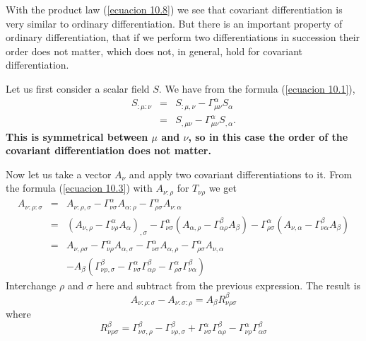 With the product law (\ref{ecuacion 10.8}) we see that covariant 
differentiation is very similar to ordinary differentiation. But there is an 
important property of ordinary differentiation, that if we perform two 
differentiations in succession their order does not matter, which does not, in 
general, hold for covariant differentiation.

Let us first consider a scalar field $S$. We have from the formula 
(\ref{ecuacion 10.1}),
\begin{equation}
 \label{ecuacion 11.1}
 \begin{array}{rcl}
 S_{:\mu:\nu} & = & S_{:\mu,\nu} - \Gamma^{\alpha}_{\mu\nu} S_{\alpha} \\
      & = & S_{,\mu\nu} - \Gamma^{\alpha}_{\mu\nu} S_{,\alpha}.
 \end{array}
\end{equation}
\textbf{This is symmetrical between $\mu$ and $\nu$, so in this 
case the order of the covariant differentiation does not matter.}

Now let us take a vector $A_{\nu}$ and apply two covariant differentiations to 
it. From the formula (\ref{ecuacion 10.3}) with $A_{\nu:\rho}$ for 
$T_{\nu\rho}$ we get
\[
 \begin{array}{rcl}
  A_{\nu:\rho:\sigma} & = & A_{\nu:\rho,\sigma} 
  - \Gamma^{\alpha}_{\nu\sigma} A_{\alpha:\rho}
  - \Gamma^{\alpha}_{\rho\sigma} A_{\nu:\alpha} \\
  & = &  \left(A_{\nu,\rho} - 
              \Gamma^{\alpha}_{\nu\rho} A_{\alpha} \right)_{,\sigma}
  - \Gamma^{\alpha}_{\nu\sigma} \left( 
      A_{\alpha,\rho} - \Gamma^{\beta}_{\alpha\rho} A_{\beta}
  \right)
  - \Gamma^{\alpha}_{\rho\sigma}  \left( 
      A_{\nu,\alpha} - \Gamma^{\beta}_{\nu\alpha} A_{\beta}
  \right)\\
  & = & A_{\nu,\rho\sigma} 
      - \Gamma^{\alpha}_{\nu\rho} A_{\alpha,\sigma}
      - \Gamma^{\alpha}_{\nu\sigma} A_{\alpha,\rho}
      - \Gamma^{\alpha}_{\rho\sigma} A_{\nu,\alpha}\\
      & & 
      -A_{\beta}\left(
        \Gamma^{\beta}_{\nu\rho,\sigma}
      - \Gamma^{\alpha}_{\nu\sigma}\Gamma^{\beta}_{\alpha\rho}
      - \Gamma^{\alpha}_{\rho\sigma}\Gamma^{\beta}_{\nu\alpha}
      \right)
 \end{array}
\]
Interchange $\rho$ and $\sigma$ here and subtract from the previous expression. 
The result is
\begin{equation}
 \label{ecuacion 11.2}
 A_{\nu:\rho:\sigma} - A_{\nu:\sigma:\rho} =
 A_{\beta}R^{\beta}_{\nu\rho\sigma}
\end{equation}
where
\begin{equation}
 \label{ecuacion 11.3}
 R^{\beta}_{\nu\rho\sigma} = 
 \Gamma^{\beta}_{\nu\sigma,\rho} - \Gamma^{\beta}_{\nu\rho,\sigma}
 + \Gamma^{\alpha}_{\nu\sigma}\Gamma^{\beta}_{\alpha\rho}
 - \Gamma^{\alpha}_{\nu\rho}\Gamma^{\beta}_{\alpha\sigma}
\end{equation}

